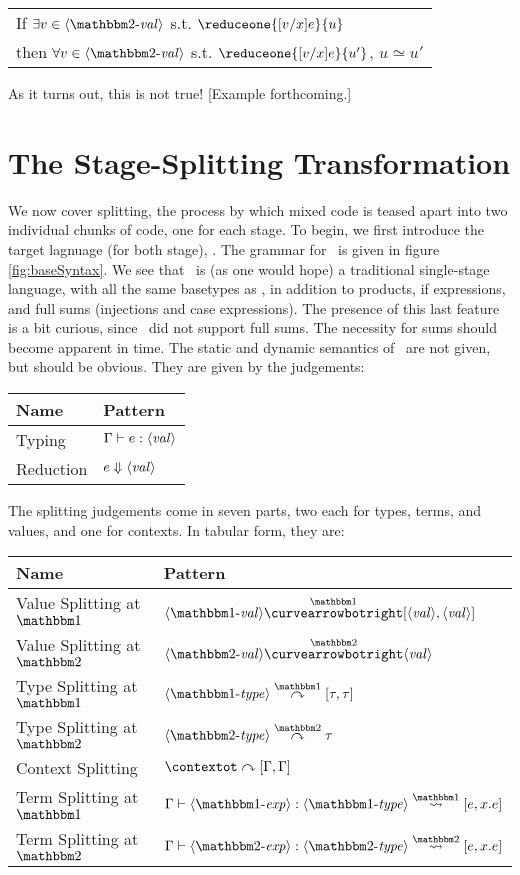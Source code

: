 \documentclass{article}
\begin{document}
\begin{center}
\begin{tabular}{l}
If $\exists v\in \valt$ s.t. $\reduceone {[v/x]e}{u}$ \\
then $\forall v\in \valt$ s.t. $\reduceone {[v/x]e}{u'}$, $u \simeq u'$
\end{tabular}
\end{center}

As it turns out, this is not true! [Example forthcoming.]




\section{The Stage-Splitting Transformation}

We now cover splitting, the process by which mixed code is teased apart into two individual chunks of code, one for each stage.  To begin, we first introduce the target lagnuage (for both stage), \ellTarget.   The grammar for \ellTarget~is given in figure \ref{fig:baseSyntax}.  We see that \ellTarget~is (as one would hope) a traditional single-stage language, with all the same basetypes as \ellStaged, in addition to products, if expressions, and full sums (injections and case expressions).  The presence of this last feature is a bit curious, since \ellStaged~did not support full sums.  The necessity for sums should become apparent in time.  The static and dynamic semantics of \ellTarget~are not given, but should be obvious.  They are given by the judgements:

\begin{center}
\begin{tabular}{|l|l|} \hline
Name & Pattern \\ \hline
Typing & ${\Gamma} \vdash {e}:{\langle\mathit{val}\rangle}$ \\  \hline
Reduction & ${e} \Downarrow {\langle\mathit{val}\rangle}$ \\ \hline
\end{tabular}
\end{center}

The splitting judgements come in seven parts, two each for types, terms, and values, and one for contexts.  In tabular form, they are:
\begin{center}
\begin{tabular}{|l|l|} \hline
Name & Pattern \\ \hline
Value Splitting at $\bbone$& $\valo \vsplito [\val,\val]$ \\  \hline
Value Splitting at $\bbtwo$& $\valt \vsplits \val$ \\  \hline
Type Splitting at $\bbone$& $\typeo \tsplito [\type,\type]$ \\  \hline
Type Splitting at $\bbtwo$& $\typet \tsplits \type$ \\  \hline
Context Splitting & $\contextot \csplit [\context,\context]$ \\  \hline
Term Splitting at $\bbone$& $\splitone{\expro}{\typeo}{\expr,\var.\expr}$ \\  \hline
Term Splitting at $\bbtwo$& $\splittwo{\exprt}{\typet}{\expr,\var.\expr}$ \\  \hline
\end{tabular}
\end{center}
\end{document}
